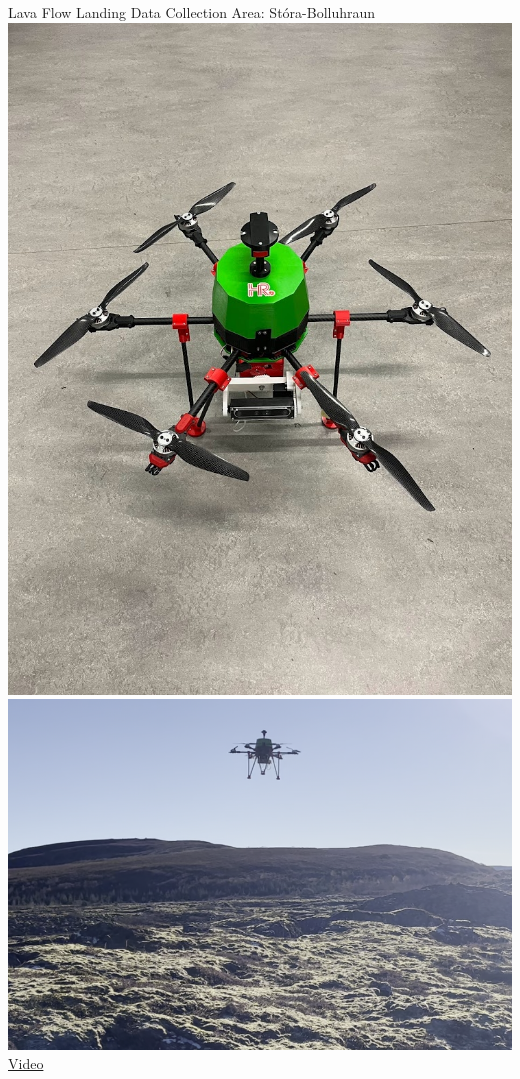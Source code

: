\documentclass[aspectratio=169]{beamer}
\begin{document}
\begin{frame}{Lava Flow Landing Data Collection Area: Stóra-Bolluhraun}
	\centering
	\includegraphics[height=0.8\textheight]{./images/depth_drone_sitting}
	\includegraphics[height=0.8\textheight]{./images/depth_drone_flying}
	\\
	\href{run:./scratch_idea_for_processing_depth_data.mp4}{Video}
\end{frame}
\end{document}

